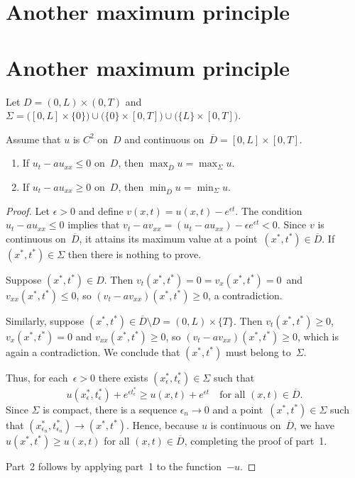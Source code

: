 \section{Another maximum principle}


\section{Another maximum principle}

Let $D=(0,L)\times(0,T)$ and
$\Sigma=\bigl([0,L]\times\{0\})\cup\bigl(\{0\}\times[0,T]\bigr)\cup
\bigl(\{L\}\times[0,T]\bigr)$.

\begin{theorem}
Assume that $u$ is $C^2$ on~$D$ and continuous
on~$\overline{D}=[0,L]\times[0,T]$.
\begin{enumerate}
\item If $u_t-au_{xx}\le0$ on~$D$, then $\max_{\overline{D}}u=\max_\Sigma u$.
\item If $u_t-au_{xx}\ge0$ on~$D$, then $\min_{\overline{D}}u=\min_\Sigma u$.
\end{enumerate}
\end{theorem}
\begin{proof}
Let $\epsilon>0$ and define $v(x,t)=u(x,t)-e^{\epsilon t}$.  The condition
$u_t-au_{xx}\le0$ implies that
$v_t-av_{xx}=(u_t-au_{xx})-\epsilon e^{\epsilon t}<0$.  Since $v$ is continuous
on~$\overline{D}$, it attains its maximum value at a
point~$(x^*,t^*)\in\overline{D}$.  If $(x^*,t^*)\in\Sigma$ then there is
nothing to prove.

Suppose $(x^*,t^*)\in D$.  Then $v_t(x^*,t^*)=0=v_x(x^*,t^*)=0$~and
$v_{xx}(x^*,t^*)\le0$, so $(v_t-av_{xx})(x^*,t^*)\ge0$, a contradiction.

Similarly, suppose $(x^*,t^*)\in\overline{D}\setminus D=(0,L)\times\{T\}$.
Then $v_t(x^*,t^*)\ge0$, $v_x(x^*,t^*)=0$ and $v_{xx}(x^*,t^*)\ge0$, so
$(v_t-av_{xx})(x^*,t^*)\ge0$, which is again a contradiction.  We conclude that
$(x^*,t^*)$ must belong to~$\Sigma$.

Thus, for each~$\epsilon>0$ there exists $(x^*_\epsilon,t^*_\epsilon)\in\Sigma$
such that
\[
u(x^*_\epsilon,t^*_\epsilon)+e^{\epsilon t^*_\epsilon}
	\ge u(x,t)+e^{\epsilon t}\quad\text{for all $(x,t)\in\overline{D}$.}
\]
Since $\Sigma$ is compact, there is a sequence $\epsilon_n\to0$ and a
point~$(x^*,t^*)\in\Sigma$ such that
$(x^*_{\epsilon_n},t^*_{\epsilon_n})\to(x^*,t^*)$.  Hence, because $u$ is
continuous on~$\overline{D}$, we have $u(x^*,t^*)\ge u(x,t)$ for all
$(x,t)\in\overline{D}$, completing the proof of part~1.

Part~2 follows by applying part~1 to the function~$-u$.
\end{proof}

